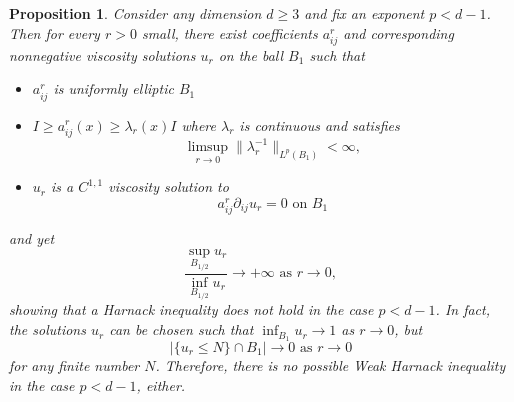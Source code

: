 \documentclass[reqno]{amsart}
\numberwithin{equation}{section}
\newtheorem{prop}[thm]{Proposition}
\numberwithin{equation}{section}
\newcommand{\ds}{\displaystyle}
\newcounter{case}
\begin{document}
\begin{prop} 
\label{prop: noHarnack} Consider any dimension $d \ge 3$ and fix an exponent $p<d-1$. Then for every $r>0$ small, there exist coefficients $a_{ij}^r$ and corresponding nonnegative viscosity solutions $u_r$ on the ball $B_1$ such that 
\begin{itemize}
\item $a_{ij}^r$ is uniformly elliptic  $B_1$ 
\item $I \ge a_{ij}^r(x) \ge \lambda_r(x)  I$ where $\lambda_r$ is continuous and satisfies 
$$\ds \limsup_{r\to 0} \|\lambda_r^{-1}\|_{L^p(B_{1})}  <\infty,$$
\item $u_r$ is a $C^{1,1}$ viscosity solution to 
$$a_{ij}^r \partial_{ij}u_r = 0 \text{ on } B_{1}$$
\end{itemize}
and yet
$$\frac{\sup_{B_{1/2}}u_r}{\inf_{B_{1/2}}u_r} \to +\infty \text{ as } r\to 0,$$
showing that a Harnack inequality does not hold in the case $p<d-1$. In fact, the solutions $u_r$ can be chosen such that $\inf_{B_1} u_r \to 1$ as $r\to 0$, but 
$$| \{u_r \le N\}\cap B_1| \to 0 \text{ as } r \to 0$$
for any finite number $N$. Therefore, there is no possible \textit{Weak Harnack} inequality in the case $p<d-1$, either.
\end{prop}
\end{document}
